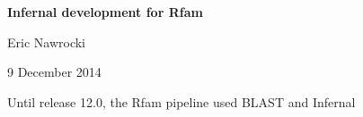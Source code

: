 \documentclass[landscape]{slides}
\begin{document}
\begin{slide}
\begin{center}
\large{\textbf{Infernal development for Rfam}}

\normalsize

Eric Nawrocki

9 December 2014

\medskip

\medskip

\small



\end{center}
\end{slide}
\begin{slide}
\begin{center}
Until release 12.0, the Rfam pipeline used BLAST and Infernal


\end{center}


\end{slide}
\end{document}
